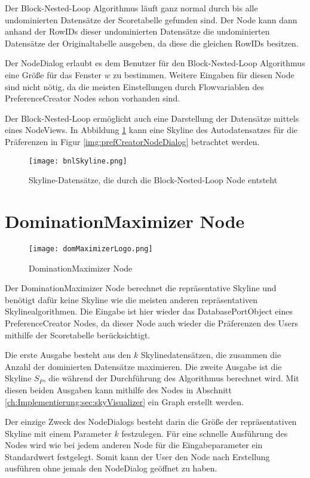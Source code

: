 Der Block-Nested-Loop Algorithmus läuft ganz normal durch bis alle undominierten Datensätze der Scoretabelle gefunden sind. Der Node kann dann anhand der RowIDs dieser undominierten Datensätze die undominierten Datensätze der Originaltabelle ausgeben, da diese die gleichen RowIDs besitzen.

Der NodeDialog erlaubt es dem Benutzer für den Block-Nested-Loop Algorithmus eine Größe für das Fenster $w$ zu bestimmen. Weitere Eingaben für diesen Node sind nicht nötig, da die meisten Einstellungen durch Flowvariablen des PreferenceCreator Nodes schon vorhanden sind.

Der Block-Nested-Loop ermöglicht auch eine Darstellung der Datensätze mittels eines NodeViews. In Abbildung \ref{img:bnlSkyline} kann eine Skyline des Autodatensatzes für die Präferenzen in Figur \ref{img:prefCreatorNodeDialog} betrachtet werden.

\begin{figure}[H]
	\centering
	\texttt{[image: bnlSkyline.png]}
	\caption{Skyline-Datensätze, die durch die Block-Nested-Loop Node entsteht}
	\label{img:bnlSkyline}
\end{figure}
\section{DominationMaximizer Node}
\label{ch:Implementierung:sec:dominationMaximizerNode}
\begin{figure}[H]
	\centering
	\texttt{[image: domMaximizerLogo.png]}
	\caption{DominationMaximizer Node}
	\label{img:domMaximierLogo}
\end{figure}

Der DominationMaximizer Node berechnet die repräsentative Skyline und benötigt dafür keine Skyline wie die meisten anderen repräsentativen Skylinealgorithmen. Die Eingabe ist hier wieder das DatabasePortObject eines PreferenceCreator Nodes, da dieser Node auch wieder die Präferenzen des Users mithilfe der Scoretabelle berücksichtigt. 

Die erste Ausgabe besteht aus den $k$ Skylinedatensätzen, die zusammen die Anzahl der dominierten Datensätze maximieren. Die zweite Ausgabe ist die Skyline $S_P$, die während der Durchführung des Algorithmus berechnet wird. Mit diesen beiden Ausgaben kann mithilfe des Nodes in Abschnitt \ref{ch:Implementierung:sec:skyVisualizer} ein Graph erstellt werden. 

Der einzige Zweck des NodeDialogs besteht darin die Größe der repräsentativen Skyline mit einem Parameter $k$ festzulegen. Für eine schnelle Ausführung des Nodes wird wie bei jedem anderen Node für die Eingabeparameter ein Standardwert festgelegt. Somit kann der User den Node nach Erstellung ausführen ohne jemals den NodeDialog geöffnet zu haben.  


